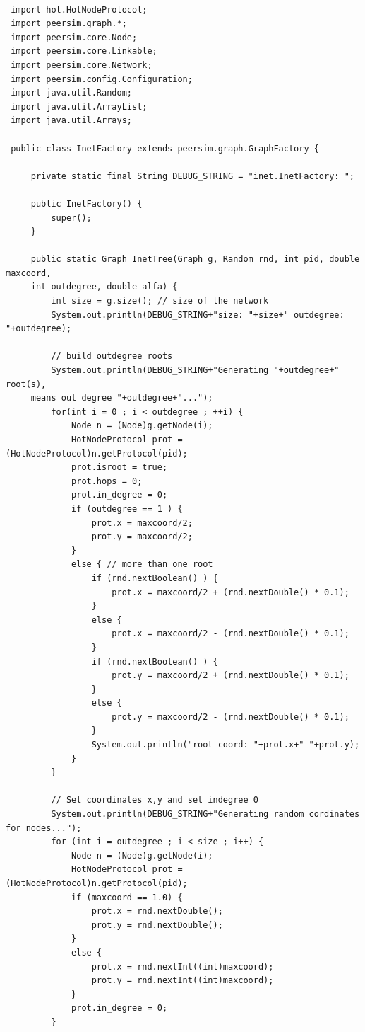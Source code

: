 \documentclass[a4paper,12pt]{article}
\begin{document}
\footnotesize
\begin{verbatim}
 
 import hot.HotNodeProtocol;
 import peersim.graph.*;
 import peersim.core.Node;
 import peersim.core.Linkable;
 import peersim.core.Network;
 import peersim.config.Configuration;
 import java.util.Random;
 import java.util.ArrayList;
 import java.util.Arrays;
 
 public class InetFactory extends peersim.graph.GraphFactory {
     
     private static final String DEBUG_STRING = "inet.InetFactory: ";
    
     public InetFactory() {
         super();
     }
     
     public static Graph InetTree(Graph g, Random rnd, int pid, double maxcoord,
     int outdegree, double alfa) {
         int size = g.size(); // size of the network
         System.out.println(DEBUG_STRING+"size: "+size+" outdegree: "+outdegree);
   
         // build outdegree roots
         System.out.println(DEBUG_STRING+"Generating "+outdegree+" root(s), 
	 means out degree "+outdegree+"...");
         for(int i = 0 ; i < outdegree ; ++i) {
             Node n = (Node)g.getNode(i);
             HotNodeProtocol prot = (HotNodeProtocol)n.getProtocol(pid);
             prot.isroot = true;
             prot.hops = 0;
             prot.in_degree = 0;
             if (outdegree == 1 ) {
                 prot.x = maxcoord/2;
                 prot.y = maxcoord/2;
             }
             else { // more than one root
                 if (rnd.nextBoolean() ) {
                     prot.x = maxcoord/2 + (rnd.nextDouble() * 0.1);
                 }
                 else {
                     prot.x = maxcoord/2 - (rnd.nextDouble() * 0.1);
                 }
                 if (rnd.nextBoolean() ) {
                     prot.y = maxcoord/2 + (rnd.nextDouble() * 0.1);
                 }
                 else {
                     prot.y = maxcoord/2 - (rnd.nextDouble() * 0.1);
                 }
                 System.out.println("root coord: "+prot.x+" "+prot.y);
             }
         }
         
         // Set coordinates x,y and set indegree 0
         System.out.println(DEBUG_STRING+"Generating random cordinates for nodes...");
         for (int i = outdegree ; i < size ; i++) {
             Node n = (Node)g.getNode(i);
             HotNodeProtocol prot = (HotNodeProtocol)n.getProtocol(pid);
             if (maxcoord == 1.0) {
                 prot.x = rnd.nextDouble();
                 prot.y = rnd.nextDouble();
             }
             else {
                 prot.x = rnd.nextInt((int)maxcoord);
                 prot.y = rnd.nextInt((int)maxcoord);
             }
             prot.in_degree = 0;
         }
       

\end{verbatim}
\end{document}
